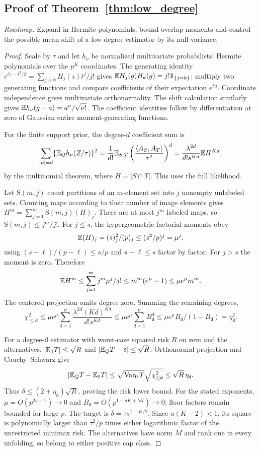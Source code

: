 \subsection{Proof of Theorem~\ref{thm:low_degree}}
\noindent\emph{Roadmap.} Expand in Hermite polynomials, bound overlap moments and control the possible mean shift of a low-degree estimator by its null variance.
\begin{proof}
Scale by $\tau$ and let $h_\nu$ be normalized multivariate probabilists' Hermite polynomials over the $p^K$ coordinates.
The generating identity
$e^{tz-t^2/2}=\sum_{j\ge0}H_j(z)t^j/j!$
gives $\mathbb E H_j(g)H_k(g)=j!\mathbf1_{\{j=k\}}$:
multiply two generating functions and compare coefficients of their expectation $e^{tu}$.
Coordinate independence gives multivariate orthonormality.
The shift calculation similarly gives
$\mathbb E h_\nu(g+a)=a^\nu/\sqrt{\nu!}$.
The coefficient identities follow by differentiation at zero of Gaussian entire moment-generating functions.

For the finite support prior, the degree-$d$ coefficient sum is
\[
 \sum_{|\nu|=d}\{\mathbb E_Qh_\nu(Z/\tau)\}^2
 =\frac1{d!}\mathbb E_{S,T}
      \left(\frac{\langle A_S,A_T\rangle}{\tau^2}\right)^d
 =\frac{\lambda^{2d}}{d!s^{Kd}}\mathbb E H^{Kd},
\]
by the multinomial theorem, where $H=|S\cap T|$.
This uses the full likelihood.

Let $\mathrm S(m,j)$ count partitions of an $m$-element set into $j$ nonempty unlabeled sets.
Counting maps according to their number of image elements gives
$H^m=\sum_{j=1}^m\mathrm S(m,j)(H)_j$.
There are at most $j^m$ labeled maps, so
$\mathrm S(m,j)\le j^m/j!$.
For $j\le s$, the hypergeometric factorial moments obey
\[
 \mathbb E(H)_j=(s)_j^2/(p)_j\le(s^2/p)^j=\mu^j,
\]
using $(s-\ell)/(p-\ell)\le s/p$ and $s-\ell\le s$ factor by factor.
For $j>s$ the moment is zero. Therefore
\[
 \mathbb E H^m\le\sum_{j=1}^m j^m\mu^j/j!
 \le m^m(e^\mu-1)\le\mu e^\mu m^m.
\]
The centered projection omits degree zero. Summing the remaining degrees,
\[
 \chi^2_{\le \mathsf d}
 \le\mu e^\mu\sum_{d=1}^{\mathsf d}
      \frac{\lambda^{2d}(Kd)^{Kd}}{d!s^{Kd}}
 \le\mu e^\mu\sum_{d=1}^{\mathsf d} B_{\mathsf d}^d
 \le\mu e^\mu B_{\mathsf d}/(1-B_{\mathsf d})=\eta_{\mathsf d}^2.
\]

For a degree-$\mathsf d$ estimator with worst-case squared risk $R$ on zero and the alternatives,
$|\mathbb E_0T|\le\sqrt R$ and $|\mathbb E_QT-\delta|\le\sqrt R$.
Orthonormal projection and Cauchy--Schwarz give
\[
 |\mathbb E_QT-\mathbb E_0T|\le
 \sqrt{\operatorname{Var}_0T}\sqrt{\chi^2_{\le \mathsf d}}\le\sqrt R\,\eta_{\mathsf d}.
\]
Thus $\delta\le(2+\eta_{\mathsf d})\sqrt R$, proving the risk lower bound.
For the stated exponents,
$\mu=O(p^{2a-1})\to0$ and $B_{\mathsf d}=O(p^{1-aK+bK})\to0$;
floor factors remain bounded for large $p$.
The target is $\delta=\tau s^{1-K/2}$.
Since $a(K-2)<1$, its square is polynomially larger than
$\tau^2/p$ times either logarithmic factor of the unrestricted minimax risk.
The alternatives have norm $M$ and rank one in every unfolding, so belong to either positive cap class.
\end{proof}

